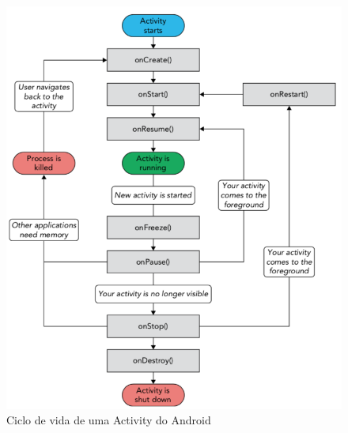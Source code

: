 \begin{figure}[htb]
    \centering
    \includegraphics[width=\textwidth]{images/android_activity_lifecycle}
    \caption[Ciclo de vida de uma Activity do Android]
    {Ciclo de vida de uma Activity do Android}%
    \label{fig:android_activity_lifecycle}
\end{figure}


